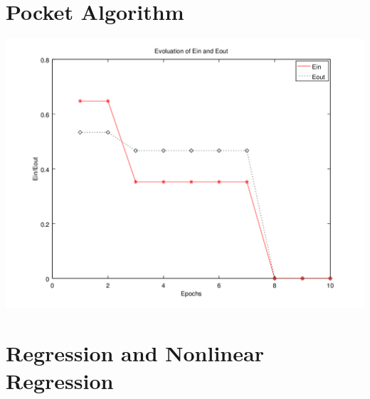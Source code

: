 \documentclass{sem6}
\begin{document}
\section{Pocket Algorithm}
\begin{center}
\includegraphics[scale=.6]{../perceptron/pocket.png}
\end{center}

\section{Regression and Nonlinear Regression}

\end{document}
